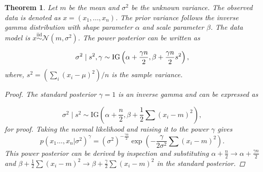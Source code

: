 \documentclass[12pt]{article}
\newtheorem{theorem}{Theorem}
\begin{document}
	\begin{theorem}
		\label{proof:pow_ing}
		Let $m$ be the mean and $\sigma^2$ be the unknown variance. The observed data is denoted as $x = (x_1, ..., x_n)$. The prior variance follows the inverse gamma distribution with shape parameter $\alpha$ and scale parameter $\beta$. The data model is $x\overset{\mathrm{iid}}{\sim} \mathcal{N}(m,\sigma^2)$. The power posterior can be written as
		
		\begin{equation}
			\sigma^2 \;|\; s^2, \gamma \sim \mathrm{IG}\left(\alpha+ \frac{\gamma n}{2}, \beta+\frac{\gamma n}{2}s^2\right),\notag
		\end{equation}
		where, $s^2 = (\sum_{i} \left( x_i - \mu \right)^2)/n$ is the  sample
		variance.
		
		\begin{proof}
			The standard posterior $\gamma=1$ is an inverse gamma and can be expressed as    
			
			\begin{equation*}
				\sigma^2  \;|\; s^2 \sim \mathrm{IG}\left(\alpha + \frac{n}{2}, \beta + \frac{1}{2} \sum(x_i - m)^2 \right),
			\end{equation*}
			\cite[see e.g.][]{gelman_bayesian_2020} for proof.
			Taking the normal likelihood and raising it to the power $\gamma$ gives 
			\begin{equation*}
				p(x_1\ldots,x_n|\sigma^2)^{\gamma}=(\sigma^2)^{-\frac{\gamma n}{2}}\exp\left(-\frac{\gamma}{2\sigma^2}\sum(x_i-m)^2\right).
			\end{equation*}
			This power posterior can be derived by inspection and substituting  $\alpha+ \frac{n}{2} \to \alpha+ \frac{\gamma n}{2}$ and $\beta+\frac{1}{2}\sum(x_i -m)^2 \to \beta+\frac{\gamma}{2}\sum(x_i -m)^2$  in the standard posterior. 
		\end{proof}
	\end{theorem}
	
\end{document}
